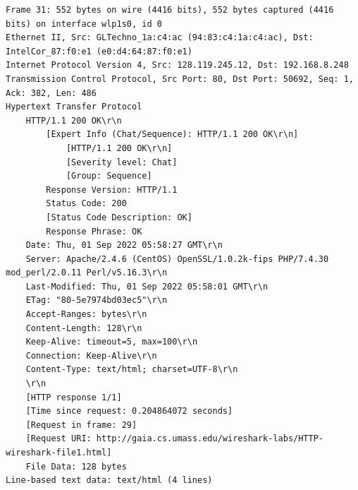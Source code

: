 \documentclass[a4paper,11pt,final]{report}
\begin{document}
\begin{lstlisting}[breaklines]
Frame 31: 552 bytes on wire (4416 bits), 552 bytes captured (4416 bits) on interface wlp1s0, id 0
Ethernet II, Src: GLTechno_1a:c4:ac (94:83:c4:1a:c4:ac), Dst: IntelCor_87:f0:e1 (e0:d4:64:87:f0:e1)
Internet Protocol Version 4, Src: 128.119.245.12, Dst: 192.168.8.248
Transmission Control Protocol, Src Port: 80, Dst Port: 50692, Seq: 1, Ack: 382, Len: 486
Hypertext Transfer Protocol
    HTTP/1.1 200 OK\r\n
        [Expert Info (Chat/Sequence): HTTP/1.1 200 OK\r\n]
            [HTTP/1.1 200 OK\r\n]
            [Severity level: Chat]
            [Group: Sequence]
        Response Version: HTTP/1.1
        Status Code: 200
        [Status Code Description: OK]
        Response Phrase: OK
    Date: Thu, 01 Sep 2022 05:58:27 GMT\r\n
    Server: Apache/2.4.6 (CentOS) OpenSSL/1.0.2k-fips PHP/7.4.30 mod_perl/2.0.11 Perl/v5.16.3\r\n
    Last-Modified: Thu, 01 Sep 2022 05:58:01 GMT\r\n
    ETag: "80-5e7974bd03ec5"\r\n
    Accept-Ranges: bytes\r\n
    Content-Length: 128\r\n
    Keep-Alive: timeout=5, max=100\r\n
    Connection: Keep-Alive\r\n
    Content-Type: text/html; charset=UTF-8\r\n
    \r\n
    [HTTP response 1/1]
    [Time since request: 0.204864072 seconds]
    [Request in frame: 29]
    [Request URI: http://gaia.cs.umass.edu/wireshark-labs/HTTP-wireshark-file1.html]
    File Data: 128 bytes
Line-based text data: text/html (4 lines)
\end{lstlisting}
\end{document}
